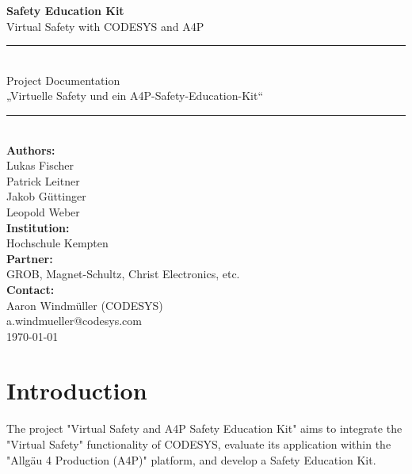 \documentclass[a4paper,12pt]{article}
\begin{document}
	
	\begin{titlepage}
		\centering
		\vspace*{2cm}
		
		{\Huge\sffamily\bfseries Safety Education Kit}\\[0.5cm]
		{\Large\sffamily Virtual Safety with CODESYS and A4P}\\[1.2cm]
		
		\rule{\linewidth}{1pt}\\[0.4cm]
		{\Large\sffamily Project Documentation}\\[0.3cm]
		{\sffamily\large „Virtuelle Safety und ein A4P-Safety-Education-Kit“}\\[0.3cm]
		\rule{\linewidth}{1pt}\\[2cm]
		
		{\sffamily\large \textbf{Authors:}}\\[0.5cm]
		{\sffamily Lukas Fischer}\\
		{\sffamily Patrick Leitner}\\
		{\sffamily Jakob Güttinger}\\
		{\sffamily Leopold Weber}\\[1.5cm]
		
		{\sffamily\large \textbf{Institution:}}\\
		{\sffamily Hochschule Kempten}\\[0.5cm]
		
		{\sffamily\large \textbf{Partner:}}\\
		{\sffamily GROB, Magnet-Schultz, Christ Electronics, etc.}\\[0.5cm]
		
		{\sffamily\large \textbf{Contact:}}\\
		{\sffamily Aaron Windmüller (CODESYS)}\\
		{\ttfamily a.windmueller@codesys.com}\\[2cm]
		
		\vfill
		{\sffamily\large \today}
	\end{titlepage}
	
	\clearpage
	\tableofcontents
	\clearpage


\section{Introduction}
The project "Virtual Safety and A4P Safety Education Kit" aims to integrate the "Virtual Safety" functionality of CODESYS, evaluate its application within the "Allgäu 4 Production (A4P)" platform, and develop a Safety Education Kit.
\end{document}
